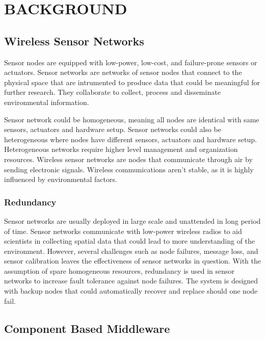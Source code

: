 \cleardoublepage
\singlespacing
\chapter{BACKGROUND}
\label{c:background}
\doublespacing\nointerlineskip

\section{Wireless Sensor Networks}

Sensor nodes are equipped with low-power, low-cost, and failure-prone
sensors or actuators. Sensor networks are networks of sensor nodes that connect to the physical space that are intrumented to produce data that could be meaningful
for further research. They collaborate to collect, process and disseminate
environmental information\cite{ArchanaBharathidasan}.

Sensor network could be homogeneous, meaning all nodes are identical with same
sensors, actuators and hardware setup. Sensor networks could also be
heterogeneous where nodes have different sensors, actuators and hardware setup.
Heterogeneous networks require higher level management and organization
resources. Wireless sensor networks are nodes that communicate through air by
sending electronic signals. Wireless communications aren't stable, as it is
highly influenced by environmental factors.

\subsection{Redundancy}

Sensor networks are usually deployed in large scale and unattended in long
period of time. Sensor networks communicate with
low-power wireless radios to aid scientists in collecting spatial data that
could lead to more understanding of the environment. However, several
challenges such as node failures, message loss, and sensor calibration leaves
the effectiveness of sensor networks in question. With the assumption of spare
homogeneous resources, redundancy is used in sensor networks to increase fault
tolerance against node failures. The system is designed with backup nodes that
could automatically recover and replace should one node fail.

\section{Component Based Middleware}

